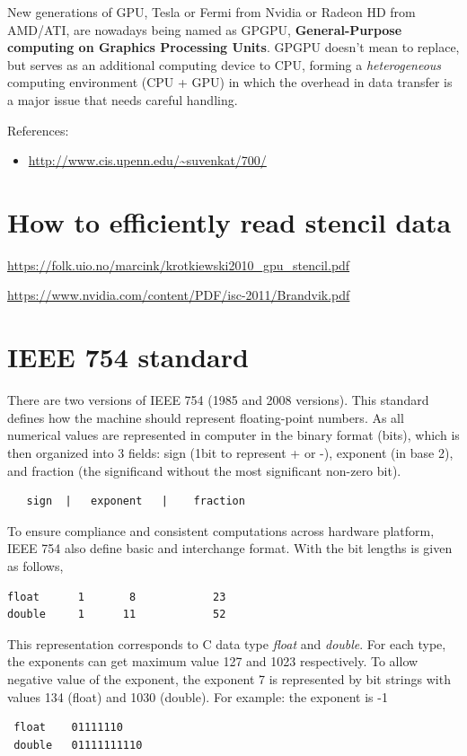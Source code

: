 

\begin{framed}
  
  New generations of GPU, Tesla or Fermi from Nvidia or Radeon HD from AMD/ATI,
  are nowadays being named as GPGPU, {\bf General-Purpose computing on Graphics
  Processing Units}.  GPGPU doesn't mean to replace, but serves as an additional
  computing device to CPU, forming a {\it heterogeneous} computing environment
  (CPU + GPU) in which the overhead in data transfer is a major issue that needs
  careful handling.
\end{framed}

References:
\begin{itemize}
\item \url{http://www.cis.upenn.edu/~suvenkat/700/}
\end{itemize}


\section{How to efficiently read stencil data}

\url{https://folk.uio.no/marcink/krotkiewski2010_gpu_stencil.pdf}

\url{https://www.nvidia.com/content/PDF/isc-2011/Brandvik.pdf}


\section{IEEE 754 standard}
\label{sec:IEEE_754}

There are two versions of IEEE 754 (1985 and 2008 versions). This standard
defines how the machine should represent floating-point
numbers. As all numerical values are represented in computer in the binary
format (bits), which is then organized into 3 fields: sign (1bit to represent
+ or -), exponent (in base 2), and fraction (the significand without the most
significant non-zero bit).
\begin{verbatim}
   sign  |   exponent   |    fraction
\end{verbatim}

To ensure compliance and consistent computations across hardware platform, IEEE
754 also define basic and interchange format. With the bit lengths is given as
follows, 
\begin{verbatim}
float      1       8            23
double     1      11            52
\end{verbatim}
This representation corresponds to C data type {\it float} and {\it double}. For
each type, the exponents can get maximum value 127 and 1023 respectively. To
allow negative value of the exponent, the exponent 7 is represented by bit
strings with values 134 (float) and 1030 (double). For example: the exponent is
-1
\begin{verbatim}
 float    01111110
 double   01111111110
\end{verbatim}

